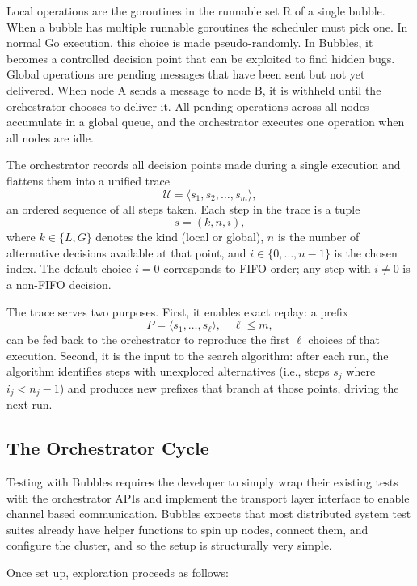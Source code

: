\documentclass[11pt]{article}
\begin{document}
Local operations are the goroutines in the runnable set R of a single bubble. When a bubble has multiple runnable goroutines the scheduler must pick one. In normal Go execution, this choice is made pseudo-randomly. In Bubbles, it becomes a controlled decision point that can be exploited to find hidden bugs. Global operations are pending messages that have been sent but not yet delivered. When node A sends a message to node B, it is withheld until the orchestrator chooses to deliver it. All pending operations across all nodes accumulate in a global queue, and the orchestrator executes one operation when all nodes are idle. 

The orchestrator records all decision points made during a single execution and flattens them into a unified trace
\[
\mathcal{U} = \langle s_1, s_2, \ldots, s_m \rangle,
\]
an ordered sequence of all steps taken. Each step in the trace is a tuple
\[
s = (k, n, i),
\]
where \(k \in \{L, G\}\) denotes the kind (local or global), \(n\) is the number of alternative decisions available at that point, and \(i \in \{0, \ldots, n-1\}\) is the chosen index. The default choice \(i = 0\) corresponds to FIFO order; any step with \(i \neq 0\) is a non-FIFO decision.

The trace serves two purposes. First, it enables exact replay: a prefix
\[
P = \langle s_1, \ldots, s_\ell \rangle, \quad \ell \leq m,
\]
can be fed back to the orchestrator to reproduce the first \(\ell\) choices of that execution. Second, it is the input to the search algorithm: after each run, the algorithm identifies steps with unexplored alternatives (i.e., steps \(s_j\) where \(i_j < n_j - 1\)) and produces new prefixes that branch at those points, driving the next run.


\subsection{The Orchestrator Cycle}

Testing with Bubbles requires the developer to simply wrap their existing tests with the orchestrator APIs and implement the transport layer interface to enable channel based communication. Bubbles expects that most distributed system test suites already have helper functions to spin up nodes, connect them, and configure the cluster, and so the setup is structurally very simple. 

Once set up, exploration proceeds as follows:
\end{document}

